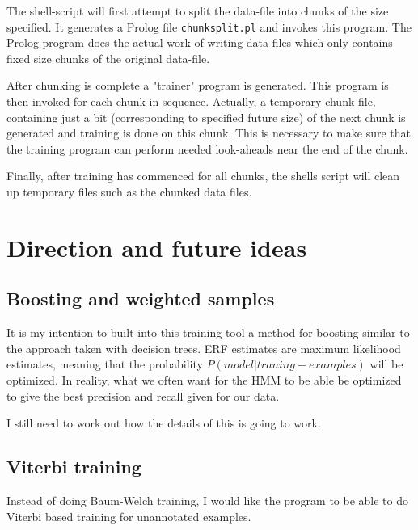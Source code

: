 \documentclass{article}
\begin{document}
The shell-script will first attempt to split the data-file into chunks of the size specified.  It generates a Prolog file \texttt{chunksplit.pl} and invokes
this program. The Prolog program does the actual work of writing data files which only contains fixed size chunks of the original data-file.

After chunking is complete a "trainer" program is generated. This program is then invoked for each chunk in sequence. Actually, a temporary 
chunk file, containing just a bit (corresponding to specified future size) of the next chunk is generated and training is done on this chunk. This 
is necessary to make sure that the training program can perform needed look-aheads near the end of the chunk.

Finally, after training has commenced for all chunks, the shells script will clean up temporary files such as the chunked data files. 

\section{Direction and future ideas}

\subsection{Boosting and weighted samples}

It is my intention to built into this training tool a method for boosting similar to the approach taken with decision trees. ERF estimates are
maximum likelihood estimates, meaning that the probability $P(model|traning-examples)$ will be optimized. In reality, what we often want
 for the HMM to be able be optimized to give the best precision and recall given for our data.
 
I still need to work out how the details of this is going to work.

\subsection{Viterbi training}

Instead of doing Baum-Welch training, I would like the program to be able to do Viterbi based training for unannotated examples.
\end{document}
